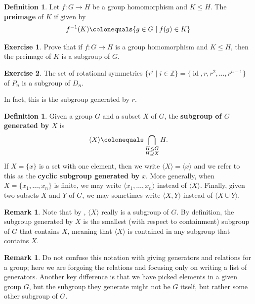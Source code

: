 \documentclass[12pt]{report}
\numberwithin{equation}{section}
\numberwithin{theorem}{chapter}
\theoremstyle{definition}
\newtheorem{definition}[theorem]{Definition}
\newtheorem{exercise}{Exercise}
\newtheorem*{basic properties}{Basic Properties}
\newtheorem*{Important Remark}{Important Remark}
\newtheorem{remark}[theorem]{Remark}
\newcommand{\Z}{\mathbb{Z}}
\DeclareMathOperator{\id}{id}
\begin{document}
\begin{definition}
Let $f\!:G\to H$ be a group homomorphism and $K\leq H$. The {\bf preimage} of $K$ if given by
$$f^{-1}(K) \colonequals \{g\in G \mid f(g)\in K\}$$
\end{definition}


\begin{exercise}\label{preimage is a subgroup}
Prove that if $f\!:G\to H$ is a group homomorphism and $K\leq H$, then the preimage of $K$ is a subgroup of $G$.
\end{exercise}




\begin{exercise}\label{rotations subgroup of D_n}
	The set of rotational symmetries $\{ r^i \mid i \in \Z \} = \{\id, r, r^2, \dots, r^{n-1}\}$ of $P_n$ is a subgroup of $D_{n}$.
\end{exercise}


In fact, this is the subgroup generated by $r$.


\begin{definition}
Given a group $G$ and a subset $X$ of $G$, the {\bf subgroup of $G$ generated by $X$} is
$$\langle X \rangle \colonequals \bigcap_{\substack{H \leq G \\ H \supseteq X}} H.$$
If $X=\{x\}$ is a set with one element, then we write $\langle X \rangle=\langle x \rangle$ and we refer to this as the {\bf cyclic subgroup generated by} $x$. More generally, when $X = \{ x_1, \ldots, x_n \}$ is finite, we may write $\langle x_1, \ldots, x_n \rangle$ instead of $\langle X \rangle$. Finally, given two subsets $X$ and $Y$ of $G$, we may sometimes write $\langle X, Y \rangle$ instead of $\langle X \cup Y \rangle$.
\end{definition}


\begin{remark}
Note that by , $\langle X \rangle$ really is a subgroup of $G$. By definition, the subgroup generated by $X$ is the smallest (with respect to containment) subgroup of $G$ that contains $X$, meaning that $\langle X \rangle$ is contained in any subgroup that contains $X$.
\end{remark}


\begin{remark}
	Do not confuse this notation with giving generators and relations for a group; here we are forgoing the relations and focusing only on writing a list of generators. Another key difference is that we have picked elements in a given group $G$, but the subgroup they generate might not be $G$ itself, but rather some other subgroup of $G$.
\end{remark}
\end{document}
